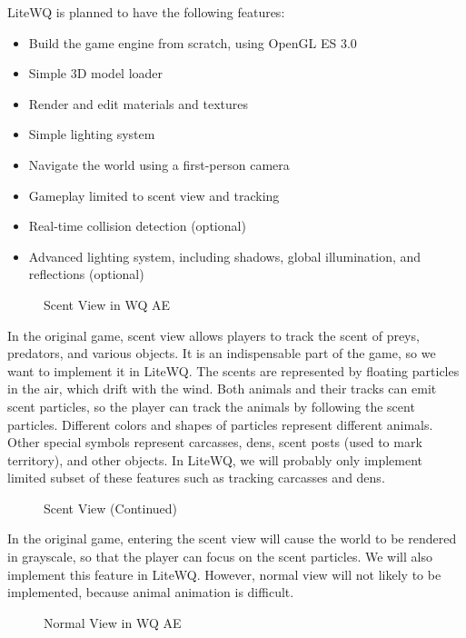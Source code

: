 \documentclass[a4paper]{article}
\providecommand{\tightlist}{%
  \setlength{\itemsep}{0pt}\setlength{\parskip}{0pt}}
\newcommand{\includegraphicx}[1]{\maxsizebox{\textwidth}{\textheight}{\texttt{[image: \#1]}}}
\begin{document}
LiteWQ is planned to have the following features:

\begin{itemize}
\tightlist
\item
  Build the game engine from scratch, using OpenGL ES 3.0
\item
  Simple 3D model loader
\item
  Render and edit materials and textures
\item
  Simple lighting system
\item
  Navigate the world using a first-person camera
\item
  Gameplay limited to scent view and tracking
\item
  Real-time collision detection (optional)
\item
  Advanced lighting system, including shadows, global illumination, and
  reflections (optional)
\end{itemize}

\begin{figure}[H]
\centering
\includegraphicx{img/scent.jpg}
\caption{Scent View in WQ AE}
\end{figure}

In the original game, scent view allows players to track the scent of
preys, predators, and various objects. It is an indispensable part of
the game, so we want to implement it in LiteWQ. The scents are
represented by floating particles in the air, which drift with the wind.
Both animals and their tracks can emit scent particles, so the player
can track the animals by following the scent particles. Different colors
and shapes of particles represent different animals. Other special
symbols represent carcasses, dens, scent posts (used to mark territory),
and other objects. In LiteWQ, we will probably only implement limited
subset of these features such as tracking carcasses and dens.

\begin{figure}[H]
\centering
\includegraphicx{img/animal_track.jpg}
\caption{Scent View (Continued)}
\end{figure}

In the original game, entering the scent view will cause the world to be
rendered in grayscale, so that the player can focus on the scent
particles. We will also implement this feature in LiteWQ. However,
normal view will not likely to be implemented, because animal animation
is difficult.

\begin{figure}[H]
\centering
\includegraphicx{img/normal.jpg}
\caption{Normal View in WQ AE}
\end{figure}
\end{document}

